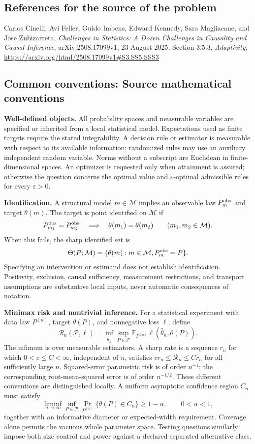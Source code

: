 \documentclass[11pt,a4paper]{article}
\newcommand{\E}{\mathbb E}
\begin{document}
\subsection*{References for the source of the problem}
Carlos Cinelli, Avi Feller, Guido Imbens, Edward Kennedy, Sara Magliacane, and Jose Zubizarreta, \emph{Challenges in Statistics: A Dozen Challenges in Causality and Causal Inference}, arXiv:2508.17099v1, 23 August 2025, Section 3.5.3, \emph{Adaptivity}.
\url{https://arxiv.org/html/2508.17099v1#S3.SS5.SSS3}

\subsection*{Common conventions: Source mathematical conventions}

\textbf{Well-defined objects.}
All probability spaces and measurable variables are specified or inherited
from a local statistical model. Expectations used as finite targets require
the stated integrability. A decision rule or estimator is measurable with
respect to its available information; randomized rules may use an auxiliary
independent random variable. Norms without a subscript are Euclidean in
finite-dimensional spaces. An optimizer is requested only when attainment
is assured; otherwise the question concerns the optimal value and
$\varepsilon$-optimal admissible rules for every $\varepsilon>0$.

\textbf{Identification.}
A structural model $m\in\mathcal M$ implies an observable law
$P_m^{\rm obs}$ and target $\theta(m)$. The target is point identified on
$\mathcal M$ if
\[
 P_{m_1}^{\rm obs}=P_{m_2}^{\rm obs}
 \quad\Longrightarrow\quad\theta(m_1)=\theta(m_2)
 \qquad(m_1,m_2\in\mathcal M).
\]
When this fails, the sharp identified set is
\[
 \Theta(P;\mathcal M)=\{\theta(m):m\in\mathcal M,
                                  P_m^{\rm obs}=P\}.
\]
Specifying an intervention or estimand does not establish identification.
Positivity, exclusion, causal sufficiency, measurement restrictions, and
transport assumptions are substantive local inputs, never automatic
consequences of notation.

\textbf{Minimax risk and nontrivial inference.}
For a statistical experiment with data law $P^{(n)}$, target $\theta(P)$,
and nonnegative loss $\ell$, define
\[
 \mathcal R_n(\mathcal P,\ell)
   =\inf_{\widehat\theta_n}\sup_{P\in\mathcal P}
      \E_{P^{(n)}}\ell(\widehat\theta_n,\theta(P)).
\]
The infimum is over measurable estimators. A sharp rate is a sequence
$r_n$ for which $0<c\leq C<\infty$, independent of $n$, satisfies
$c r_n\leq\mathcal R_n\leq C r_n$ for all sufficiently large $n$.
Squared-error parametric risk is of order $n^{-1}$; the corresponding
root-mean-squared error is of order $n^{-1/2}$. These different conventions
are distinguished locally. A uniform asymptotic confidence region $C_n$
must satisfy
\[
 \liminf_{n\to\infty}\inf_{P\in\mathcal P}
     \Pr_{P^{(n)}}\{\theta(P)\in C_n\}\geq 1-\alpha,
 \qquad 0<\alpha<1,
\]
together with an informative diameter or expected-width requirement.
Coverage alone permits the vacuous whole parameter space. Testing questions
similarly impose both size control and power against a declared separated
alternative class.
\end{document}

